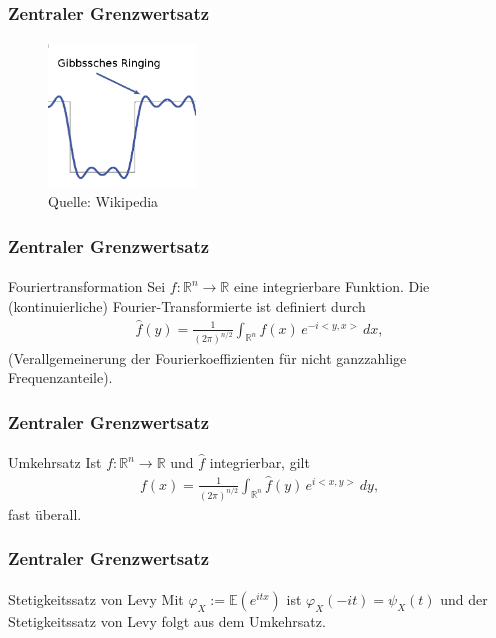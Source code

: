 \documentclass{beamer}
\begin{document}
\begin{frame}
    \frametitle{Zentraler Grenzwertsatz}
\framesubtitle{}

\begin{figure}[htp]
      \centering
    \includegraphics[width=0.35\textwidth]{img/Gibb}
      \caption{Quelle: Wikipedia}
\end{figure}

 \end{frame}



\begin{frame}
    \frametitle{Zentraler Grenzwertsatz}
\framesubtitle{}

\begin{block}{Fouriertransformation}
Sei $f: \mathbb{R}^n \to \mathbb{R}$ eine integrierbare Funktion. Die (kontinuierliche) Fourier-Transformierte ist definiert durch
\begin{align*}
\hat{ f}(y) = \frac{1}{\left(2\pi \right)^{n/2}} \int_{\mathbb{R}^n} f(x)\,e^{-i  <y, x>} \, d x,
\end{align*}
(Verallgemeinerung der Fourierkoeffizienten für nicht ganzzahlige Frequenzanteile).
\end{block}

 \end{frame}


\begin{frame}
    \frametitle{Zentraler Grenzwertsatz}
\framesubtitle{}

\begin{block}{Umkehrsatz}
Ist $f: \mathbb{R}^n  \to  \mathbb{R}$ und $\hat{ f}$ integrierbar, gilt
\begin{align*}
f(x) = \frac{1}{\left(2\pi \right)^{n/2}} \int_{\mathbb{R}^n}\hat{ f}(y) \,e^{i  <x, y>} \, d y,
\end{align*}
fast überall.
\end{block}
 \end{frame}



\begin{frame}
    \frametitle{Zentraler Grenzwertsatz}
\framesubtitle{}

\begin{block}{Stetigkeitssatz von Levy}
Mit $\varphi_{X} := \mathbb{E}(e^{i tx})$  ist $\varphi _{X}(-it)=\psi_{X}(t)$ und der Stetigkeitssatz von Levy folgt aus dem Umkehrsatz.
\end{block}
 \end{frame}
\end{document}
